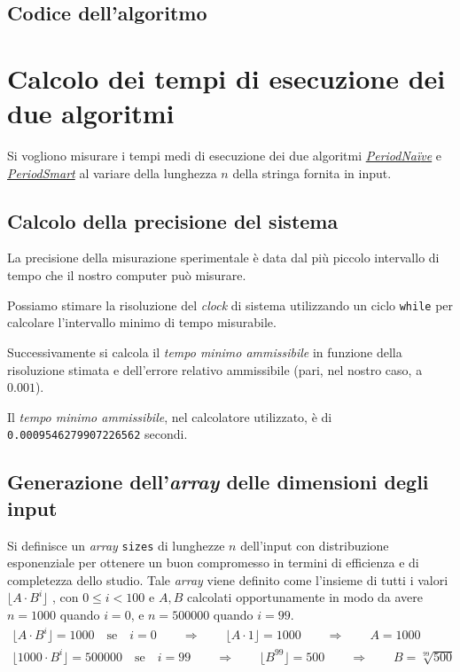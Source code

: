 \documentclass[11pt,a4paper,italian]{article}
\begin{document}
\subsection{Codice dell'algoritmo}
 

\section{Calcolo dei tempi di esecuzione dei due algoritmi}
Si vogliono misurare i tempi medi di esecuzione dei due algoritmi \hyperlink{section.2}{\textit{PeriodNa{\"i}ve}} e \hyperlink{section.3}{\textit{PeriodSmart}} al variare della lunghezza $n$ della stringa fornita in input.

\subsection{Calcolo della precisione del sistema}
La precisione della misurazione sperimentale è data dal più piccolo intervallo di tempo che il nostro computer può misurare.

Possiamo stimare la risoluzione del \textit{clock} di sistema utilizzando un ciclo \texttt{while} per calcolare l'intervallo minimo di tempo misurabile.

Successivamente si calcola il \textit{tempo minimo ammissibile} in funzione della risoluzione stimata e dell'errore relativo ammissibile (pari, nel nostro caso, a $0.001$).

Il \textit{tempo minimo ammissibile}, nel calcolatore utilizzato, è di \texttt{0.0009546279907226562} secondi.

\subsection{Generazione dell'\textit{array} delle dimensioni degli input}
Si definisce un \textit{array} \texttt{sizes} di lunghezze $n$ dell'input con distribuzione esponenziale per ottenere un buon compromesso in termini di efficienza e di completezza dello studio. Tale \textit{array} viene definito come l'insieme di tutti i valori  $ \bigl\lfloor A \cdot B^i \bigl\rfloor $ , con $ 0 \leq i <  100 $ e $A, B$ calcolati opportunamente in modo da avere $n = 1000$ quando $i = 0$, e $n = 500000$ quando $i = 99$.
\begin{gather*}
\bigl\lfloor A \cdot B^i \bigl\rfloor = 1000 \quad \text{se} \quad i = 0 \qquad \Rightarrow \qquad \bigl\lfloor A \cdot 1 \bigl\rfloor = 1000 \qquad \Rightarrow \qquad A = 1000\\
\bigl\lfloor 1000 \cdot B^i \bigl\rfloor = 500000 \quad \text{se} \quad i = 99 \qquad \Rightarrow \qquad \bigl\lfloor B^{99} \bigl\rfloor = 500 \qquad \Rightarrow \qquad B = \sqrt[99]{500}
\end{gather*}


\end{document}
